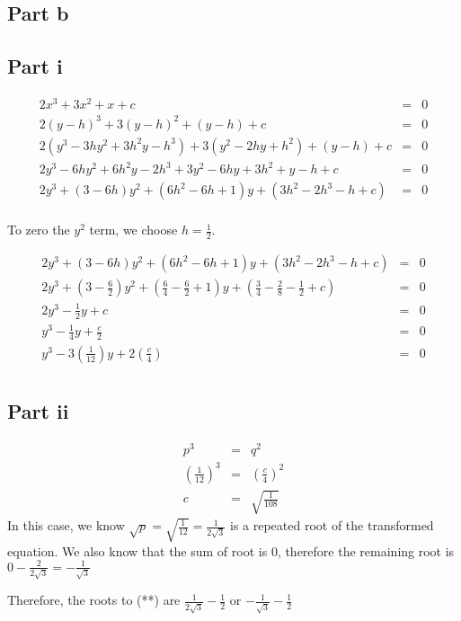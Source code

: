 \subsection*{Part b}
\subsection*{Part i}
\begin{eqnarray*}
  2x^3 + 3x^2 + x + c &=& 0 \\
  2(y-h)^3 + 3(y-h)^2 + (y - h) + c &=& 0 \\
  2(y^3 - 3hy^2 + 3h^2y - h^3) + 3(y^2 - 2hy + h^2) + (y - h) + c &=& 0 \\
  2y^3 - 6hy^2 + 6h^2y - 2h^3 + 3y^2 - 6hy + 3h^2 + y - h + c &=& 0 \\
  2y^3 + (3 - 6h)y^2 + (6h^2 - 6h + 1)y + (3h^2 - 2h^3 - h + c) &=& 0 \\
\end{eqnarray*}

To zero the $ y^2 $ term, we choose $ h = \frac{1}{2} $.

\begin{eqnarray*}
  2y^3 + (3 - 6h)y^2 + (6h^2 - 6h + 1)y + (3h^2 - 2h^3 - h + c) &=& 0 \\
  2y^3 + (3 - \frac{6}{2})y^2 + (\frac{6}{4} - \frac{6}{2} + 1)y + (\frac{3}{4} - \frac{2}{8} - \frac{1}{2} + c) &=& 0 \\
  2y^3 - \frac{1}{2}y + c &=& 0 \\
  y^3 - \frac{1}{4}y + \frac{c}{2} &=& 0 \\
  y^3 - 3\left(\frac{1}{12}\right)y + 2\left(\frac{c}{4}\right) &=& 0 \\
\end{eqnarray*}
\subsection*{Part ii}
\begin{eqnarray*}
  p^3 &=& q^2 \\
  \left(\frac{1}{12}\right)^3 &=& \left(\frac{c}{4}\right)^2 \\
  c &=& \sqrt{\frac{1}{108}}
\end{eqnarray*}
In this case, we know $ \sqrt{p} = \sqrt{\frac{1}{12}} = \frac{1}{2\sqrt{3}} $ is a repeated root of the transformed equation. We also know that the sum of root is $ 0 $, therefore the remaining root is $ 0 - \frac{2}{2\sqrt{3}} = - \frac{1}{\sqrt{3}} $

Therefore, the roots to (**) are $ \frac{1}{2\sqrt{3}} - \frac{1}{2} $ or $ -\frac{1}{\sqrt{3}} - \frac{1}{2} $